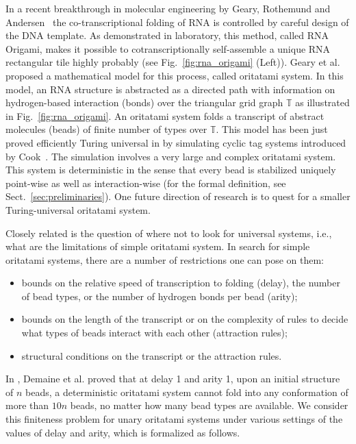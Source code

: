 \documentclass[runningheads]{llncs}
\begin{document}
In a recent breakthrough in molecular engineering by Geary, Rothemund and Andersen~\cite{GearyRothemundAndersen2014} the co-transcriptional folding of RNA is controlled by careful design of the DNA template. As demonstrated in laboratory, this method, called RNA Origami, makes it possible to cotranscriptionally self-assemble a unique RNA rectangular tile highly probably (see Fig.~\ref{fig:rna_origami} (Left)). 
Geary et al.~\cite{GeMeScSe2016} proposed a mathematical model for this process, called oritatami system. 
In this model, an RNA structure is abstracted as a directed path with information on hydrogen-based interaction (bonds) over the triangular grid graph $\mathbb{T}$ as illustrated in Fig.~\ref{fig:rna_origami}. 
An oritatami system folds a transcript of abstract molecules (beads) of finite number of types over $\mathbb{T}$. 
This model has been just proved efficiently Turing universal in \cite{GeMeScSe2018} by simulating cyclic tag systems introduced by Cook~\cite{Cook2004}. 
The simulation involves a very large and complex oritatami system. 
This system is deterministic in the sense that every bead is stabilized uniquely point-wise as well as interaction-wise (for the formal definition, see Sect.~\ref{sec:preliminaries}). 
One future direction of research is to quest for a smaller Turing-universal oritatami system.




Closely related is the question of where not to look for universal systems, i.e., what are the limitations of simple oritatami system. 
In search for simple oritatami systems, there are a number of restrictions one can pose on them:
\begin{itemize}
\item bounds on the relative speed of transcription to folding (delay), the number of bead types, or the number of hydrogen bonds per bead (arity);
\item bounds on the length of the transcript or on the complexity of rules to decide what types of beads interact with each other (attraction rules);
\item structural conditions on the transcript or the attraction rules.
\end{itemize}
%
In \cite{DHOPRSST2018}, Demaine et al. proved that at delay 1 and arity 1, upon an initial structure of $n$ beads, a deterministic oritatami system cannot fold into any conformation of more than $10n$ beads, no matter how many bead types are available. 
We consider this finiteness problem for unary oritatami systems under various settings of the values of delay and arity, which is formalized as follows. 
\end{document}
